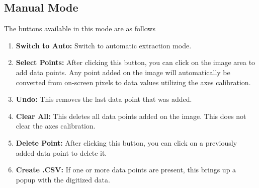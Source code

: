 \documentclass[letterpaper, 10pt]{article}
\begin{document}
\subsection{Manual Mode}
The buttons available in this mode are as follows
\begin{enumerate}
\item{{\bf Switch to Auto: }Switch to automatic extraction mode.}
\item{{\bf Select Points: }After clicking this button, you can click on the image area to add data points. Any point added on the image will automatically be converted from on-screen pixels to data values utilizing the axes calibration.}
\item{{\bf Undo: }This removes the last data point that was added.}
\item{{\bf Clear All: }This deletes all data points added on the image. This does not clear the axes calibration.}
\item{{\bf Delete Point: }After clicking this button, you can click on a previously added data point to delete it.}
\item{{\bf Create .CSV: }If one or more data points are present, this brings up a popup with the digitized data.}
\end{enumerate}
\end{document}
